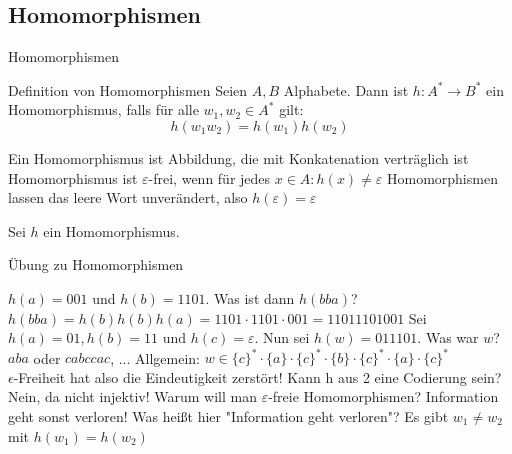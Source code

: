 \subsection{Homomorphismen}

\begin{frame}{Homomorphismen}
	\begin{block} {Definition von Homomorphismen}\p
		Seien $A, B$ Alphabete. \p Dann ist $h: A^* \rightarrow B^*$ \p ein Homomorphismus\p , falls für alle $w_1, w_2 \in A^*$ gilt:\\ \p
		\begin{equation*}
		h(w_1w_2) = h(w_1)h(w_2)
		\end{equation*}
	\end{block}

	\begin{itemize}
		\pitem Ein Homomorphismus ist Abbildung, die mit Konkatenation verträglich ist
		\pitem Homomorphismus ist $\varepsilon$-frei, wenn für jedes $x \in A: h(x) \neq \varepsilon$
		\pitem Homomorphismen lassen das leere Wort unverändert, also $h(\varepsilon) = \varepsilon$
	\end{itemize}
\end{frame}

\begin{frame}
	Sei $h$ ein Homomorphismus.
	
	\begin{taskblock}{Übung zu Homomorphismen}
			\begin{enumerate}
				\pitem $h(a) = 001$ und $h(b) = 1101$. Was ist dann $h(bba)$? 
				\pitem[$\rightarrow$] $h(bba) = h(b)h(b)h(a) = 1101 \cdot 1101 \cdot 001 = 11011101001$
				\pitem Sei $h(a) = 01, h(b) = 11 \text{ und } h(c) = \varepsilon$. Nun sei $h(w)= 011101$. Was war $w$? 
				\pitem[$\rightarrow$] $aba$ oder $cabccac$, ... Allgemein: $w \in \{c\}^* \cdot \{a\} \cdot \{c\}^* \cdot \{b\} \cdot \{c\}^* \cdot \{a\} \cdot \{c\}^*$ \\ \p $\epsilon$-Freiheit hat also die Eindeutigkeit zerstört!
				\pitem Kann h aus 2 eine Codierung sein?
				\pitem[$\rightarrow$] Nein, da nicht injektiv!
				\pitem Warum will man $\varepsilon$-freie Homomorphismen?
				\pitem[$\rightarrow$] Information geht sonst verloren!
				\pitem Was heißt hier "Information geht verloren"? 
				\pitem[$\rightarrow$] Es gibt $w_1 \neq w_2$ mit $h(w_1) = h(w_2)$
			\end{enumerate}
	\end{taskblock}
\end{frame}

